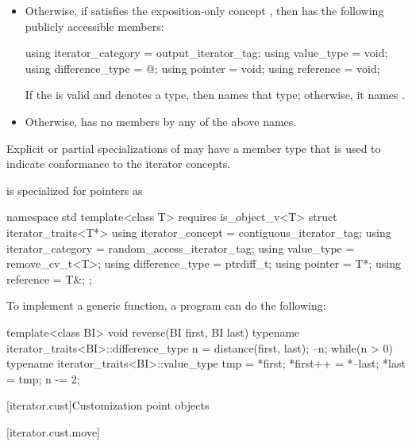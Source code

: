 \begin{itemize}
\item
Otherwise, if  satisfies the exposition-only concept
, then 
has the following publicly accessible
members:
\begin{codeblock}
using iterator_category = output_iterator_tag;
using value_type        = void;
using difference_type   = @\seebelow@;
using pointer           = void;
using reference         = void;
\end{codeblock}
If the 
 is valid and denotes a type,
then  names that type; otherwise, it names .

\item
Otherwise, 
has no members by any of the above names.
\end{itemize}

\pnum
Explicit or partial specializations of  may
have a member type  that is used to indicate
conformance to the iterator concepts.

\pnum
{} is specialized for pointers as
\begin{codeblock}
namespace std {
  template<class T>
    requires is_object_v<T>
  struct iterator_traits<T*> {
    using iterator_concept  = contiguous_iterator_tag;
    using iterator_category = random_access_iterator_tag;
    using value_type        = remove_cv_t<T>;
    using difference_type   = ptrdiff_t;
    using pointer           = T*;
    using reference         = T&;
  };
}
\end{codeblock}

\pnum
\begin{example}
To implement a generic
function, a \Cpp{} program can do the following:
\begin{codeblock}
template<class BI>
void reverse(BI first, BI last) {
  typename iterator_traits<BI>::difference_type n =
    distance(first, last);
  --n;
  while(n > 0) {
    typename iterator_traits<BI>::value_type
     tmp = *first;
    *first++ = *--last;
    *last = tmp;
    n -= 2;
  }
}
\end{codeblock}
\end{example}

[iterator.cust]{Customization point objects}

[iterator.cust.move]{}

